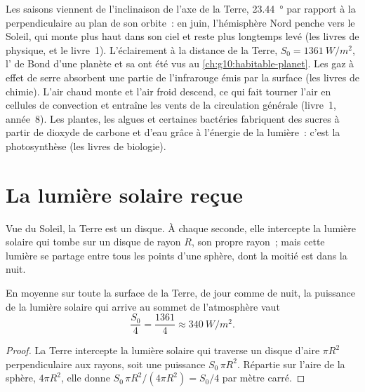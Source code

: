 \begin{recall}
Les saisons viennent de l'inclinaison de l'axe de la Terre,
\qty{23.44}{\degree} par rapport à la perpendiculaire au plan de son
orbite~: en juin, l'hémisphère Nord penche vers le Soleil, qui monte plus
haut dans son ciel et reste plus longtemps levé (les livres de physique, et
le livre~1). L'éclairement à la distance de la Terre,
$S_0 = \qty{1361}{W/m^2}$, l' de Bond d'une planète et sa  ont été vus au \cref{ch:g10:habitable-planet}. Les gaz à effet
de serre absorbent une partie de l'infrarouge émis par la surface (les
livres de chimie). L'air chaud monte et l'air froid descend, ce qui fait
tourner l'air en cellules de convection et entraîne les vents de la
circulation générale (livre~1, année~8). Les plantes, les algues et
certaines bactéries fabriquent des sucres à partir de dioxyde de carbone et
d'eau grâce à l'énergie de la lumière~: c'est la photosynthèse (les livres
de biologie).
\end{recall}

\section{La lumière solaire reçue}

Vue du Soleil, la Terre est un disque. À chaque seconde, elle intercepte la
lumière solaire qui tombe sur un disque de rayon $R$, son propre rayon~;
mais cette lumière se partage entre tous les points d'une sphère, dont la
moitié est dans la nuit.

\begin{proposition}\label{prop:g10:earth-energy-budget:quarter}
En moyenne sur toute la surface de la Terre, de jour comme de nuit, la
puissance de la lumière solaire qui arrive au sommet de l'atmosphère vaut
\[
  \frac{S_0}{4} = \frac{1361}{4} \approx \qty{340}{W/m^2}.
\]
\end{proposition}

\begin{proof}
La Terre intercepte la lumière solaire qui traverse un disque d'aire
$\pi R^2$ perpendiculaire aux rayons, soit une puissance $S_0\,\pi R^2$.
Répartie sur l'aire de la sphère, $4\pi R^2$, elle donne $S_0\,\pi R^2/(4\pi R^2) =
S_0/4$ par mètre carré.
\end{proof}

